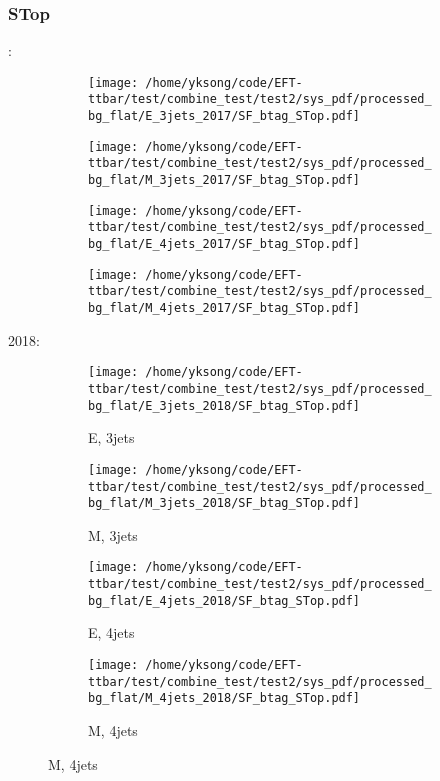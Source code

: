 \documentclass{beamer}
\begin{document}
\begin{frame}
\frametitle{STop}
\fontsize{5}{1}:
\begin{figure}
\centering
\begin{subfigure}[b]{0.24\textwidth}
\texttt{[image: /home/yksong/code/EFT-ttbar/test/combine\_test/test2/sys\_pdf/processed\_bg\_flat/E\_3jets\_2017/SF\_btag\_STop.pdf]}
\end{subfigure}
\begin{subfigure}[b]{0.24\textwidth}
\texttt{[image: /home/yksong/code/EFT-ttbar/test/combine\_test/test2/sys\_pdf/processed\_bg\_flat/M\_3jets\_2017/SF\_btag\_STop.pdf]}
\end{subfigure}
\begin{subfigure}[b]{0.24\textwidth}
\texttt{[image: /home/yksong/code/EFT-ttbar/test/combine\_test/test2/sys\_pdf/processed\_bg\_flat/E\_4jets\_2017/SF\_btag\_STop.pdf]}
\end{subfigure}
\begin{subfigure}[b]{0.24\textwidth}
\texttt{[image: /home/yksong/code/EFT-ttbar/test/combine\_test/test2/sys\_pdf/processed\_bg\_flat/M\_4jets\_2017/SF\_btag\_STop.pdf]}
\end{subfigure}
\end{figure}
2018:
\begin{figure}
\centering
\begin{subfigure}[b]{0.24\textwidth}
\texttt{[image: /home/yksong/code/EFT-ttbar/test/combine\_test/test2/sys\_pdf/processed\_bg\_flat/E\_3jets\_2018/SF\_btag\_STop.pdf]}
\captionsetup{font=tiny}
\caption{E, 3jets}
\end{subfigure}
\begin{subfigure}[b]{0.24\textwidth}
\texttt{[image: /home/yksong/code/EFT-ttbar/test/combine\_test/test2/sys\_pdf/processed\_bg\_flat/M\_3jets\_2018/SF\_btag\_STop.pdf]}
\captionsetup{font=tiny}
\caption{M, 3jets}
\end{subfigure}
\begin{subfigure}[b]{0.24\textwidth}
\texttt{[image: /home/yksong/code/EFT-ttbar/test/combine\_test/test2/sys\_pdf/processed\_bg\_flat/E\_4jets\_2018/SF\_btag\_STop.pdf]}
\captionsetup{font=tiny}
\caption{E, 4jets}
\end{subfigure}
\begin{subfigure}[b]{0.24\textwidth}
\texttt{[image: /home/yksong/code/EFT-ttbar/test/combine\_test/test2/sys\_pdf/processed\_bg\_flat/M\_4jets\_2018/SF\_btag\_STop.pdf]}
\captionsetup{font=tiny}
\caption{M, 4jets}
\end{subfigure}
\end{figure}
\end{frame}
\end{document}
